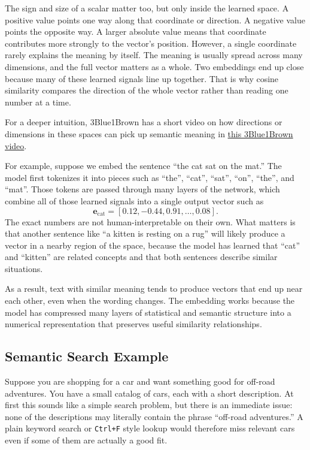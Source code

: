 \documentclass[12pt]{article}
\begin{document}
The sign and size of a scalar matter too, but only inside the learned
space. A positive value points one way along that coordinate or direction.
A negative value points the opposite way. A larger absolute value means
that coordinate contributes more strongly to the vector's position.
However, a single coordinate rarely explains the meaning by itself. The
meaning is usually spread across many dimensions, and the full vector
matters as a whole. Two embeddings end up close because many of these
learned signals line up together. That is why cosine similarity compares
the direction of the whole vector rather than reading one number at a
time.

For a deeper intuition, 3Blue1Brown has a short video on how directions or
dimensions in these spaces can pick up semantic meaning in
\href{https://youtube.com/shorts/FJtFZwbvkI4?si=rtebhzbhDrnXiyIL}{this
3Blue1Brown video}.

For example, suppose we embed the sentence ``the cat sat on the mat.'' The
model first tokenizes it into pieces such as ``the'', ``cat'', ``sat'',
``on'', ``the'', and ``mat''. Those tokens are passed through many layers
of the network, which combine all of those learned signals into a single
output vector such as
\[
\mathbf{e}_{\text{cat}} = [0.12, -0.44, 0.91, \dots, 0.08].
\]
The exact numbers are not human-interpretable on their own. What matters
is that another sentence like ``a kitten is resting on a rug'' will likely
produce a vector in a nearby region of the space, because the model has
learned that ``cat'' and ``kitten'' are related concepts and that both
sentences describe similar situations.

As a result, text with similar meaning tends to produce vectors that end
up near each other, even when the wording changes. The embedding works
because the model has compressed many layers of statistical and semantic
structure into a numerical representation that preserves useful similarity
relationships.

\subsection{Semantic Search Example}

Suppose you are shopping for a car and want something good for
off-road adventures. You have a small catalog of cars, each with a short
description. At first this sounds like a simple search problem, but there
is an immediate issue: none of the descriptions may literally contain the
phrase ``off-road adventures.'' A plain keyword search or \texttt{Ctrl+F}
style lookup would therefore miss relevant cars even if some of them are
actually a good fit.
\end{document}
